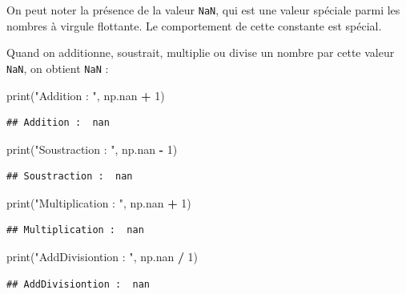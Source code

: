\documentclass[
  12pt,
]{book}
\newenvironment{Shaded}{\begin{snugshade}}{\end{snugshade}}
\newcommand{\BuiltInTok}[1]{#1}
\newcommand{\DecValTok}[1]{\textcolor[rgb]{0.00,0.00,0.81}{#1}}
\newcommand{\NormalTok}[1]{#1}
\newcommand{\OperatorTok}[1]{\textcolor[rgb]{0.81,0.36,0.00}{\textbf{#1}}}
\newcommand{\StringTok}[1]{\textcolor[rgb]{0.31,0.60,0.02}{#1}}
\numberwithin{equation}{section}
\numberwithin{countremarque}{section}
\begin{document}
On peut noter la présence de la valeur \texttt{NaN}, qui est une valeur spéciale parmi les nombres à virgule flottante. Le comportement de cette constante est spécial.

Quand on additionne, soustrait, multiplie ou divise un nombre par cette valeur \texttt{NaN}, on obtient \texttt{NaN} :

\begin{Shaded}
\begin{Highlighting}[]
\BuiltInTok{print}\NormalTok{(}\StringTok{"Addition : "}\NormalTok{, np.nan }\OperatorTok{+} \DecValTok{1}\NormalTok{)}
\end{Highlighting}
\end{Shaded}

\begin{lstlisting}
## Addition :  nan
\end{lstlisting}

\begin{Shaded}
\begin{Highlighting}[]
\BuiltInTok{print}\NormalTok{(}\StringTok{"Soustraction : "}\NormalTok{, np.nan }\OperatorTok{{-}} \DecValTok{1}\NormalTok{)}
\end{Highlighting}
\end{Shaded}

\begin{lstlisting}
## Soustraction :  nan
\end{lstlisting}

\begin{Shaded}
\begin{Highlighting}[]
\BuiltInTok{print}\NormalTok{(}\StringTok{"Multiplication : "}\NormalTok{, np.nan }\OperatorTok{+} \DecValTok{1}\NormalTok{)}
\end{Highlighting}
\end{Shaded}

\begin{lstlisting}
## Multiplication :  nan
\end{lstlisting}

\begin{Shaded}
\begin{Highlighting}[]
\BuiltInTok{print}\NormalTok{(}\StringTok{"AddDivisiontion : "}\NormalTok{, np.nan }\OperatorTok{/} \DecValTok{1}\NormalTok{)}
\end{Highlighting}
\end{Shaded}

\begin{lstlisting}
## AddDivisiontion :  nan
\end{lstlisting}
\end{document}
